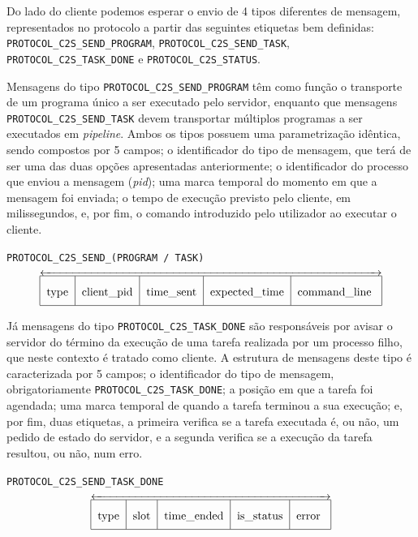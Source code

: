 \documentclass[11pt]{article}
\begin{document}
Do lado do cliente podemos esperar o envio de 4 tipos diferentes de mensagem, representados no
protocolo a partir das seguintes etiquetas bem definidas: \texttt{PROTOCOL\_C2S\_SEND\_PROGRAM},
\texttt{PROTOCOL\_C2S\_SEND\_TASK}, \texttt{PROTOCOL\_C2S\_TASK\_DONE} e
\texttt{PROTOCOL\_C2S\_STATUS}.

Mensagens do tipo \texttt{PROTOCOL\_C2S\_SEND\_PROGRAM} têm como função o transporte de um programa
único a ser executado pelo servidor, enquanto que mensagens \texttt{PROTOCOL\_C2S\_SEND\_TASK} devem
transportar múltiplos programas a ser executados em \emph{pipeline}. Ambos os tipos possuem uma
parametrização idêntica, sendo compostos por 5 campos; o identificador do tipo de mensagem, que terá
de ser uma das duas opções apresentadas anteriormente; o identificador do processo que enviou a
mensagem (\emph{pid}); uma marca temporal do momento em que a mensagem foi enviada; o tempo de
execução previsto pelo cliente, em milissegundos, e, por fim, o comando introduzido pelo utilizador
ao executar o cliente.

\begin{center}
    \abovedisplayskip=-1pt
    \texttt{PROTOCOL\_C2S\_SEND\_(PROGRAM / TASK)}
    $$\overleftrightarrow{
        \begin{tabular}{|c|c|c|c|c|}
            \hline
                type & client\_pid & time\_sent & expected\_time & command\_line
                \rule[-2ex]{0pt}{6ex}\\
            \hline
        \end{tabular}
    }$$
\end{center}

Já mensagens do tipo \texttt{PROTOCOL\_C2S\_TASK\_DONE} são responsáveis por avisar o servidor do
término da execução de uma tarefa realizada por um processo filho, que neste contexto é tratado como
cliente. A estrutura de mensagens deste tipo é caracterizada por 5 campos; o identificador do tipo
de mensagem, obrigatoriamente \texttt{PROTOCOL\_C2S\_TASK\_DONE}; a posição em que a tarefa foi
agendada; uma marca temporal de quando a tarefa terminou a sua execução; e, por fim, duas etiquetas,
a primeira verifica se a tarefa executada é, ou não, um pedido de estado do servidor, e a segunda
verifica se a execução da tarefa resultou, ou não, num erro.

\begin{center}
    \abovedisplayskip=-1pt
    \texttt{PROTOCOL\_C2S\_SEND\_TASK\_DONE}
    $$\overleftrightarrow{
        \begin{tabular}{|c|c|c|c|c|}
            \hline
                type & slot & time\_ended & is\_status & error
                \rule[-2ex]{0pt}{6ex}\\
            \hline
        \end{tabular}
    }$$
\end{center}
\end{document}
